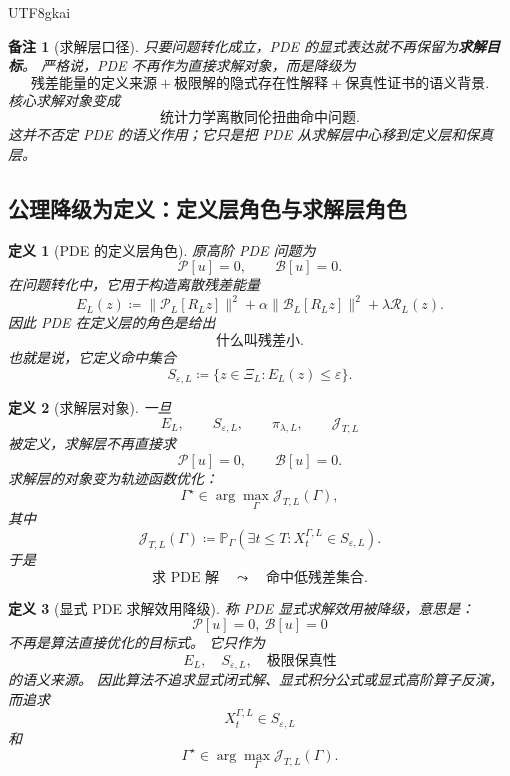 \documentclass[12pt]{article}
\newtheorem{definition}{定义}[section]
\newtheorem{remark}{备注}[section]
\newcommand{\DefEq}{\coloneqq}
\begin{document}
\begin{CJK*}{UTF8}{gkai}
\begin{remark}[求解层口径]
只要问题转化成立，PDE 的显式表达就不再保留为\textbf{求解目标}。
严格说，PDE 不再作为直接求解对象，而是降级为
\[
  \boxed{
  \text{残差能量的定义来源}
  +
  \text{极限解的隐式存在性解释}
  +
  \text{保真性证书的语义背景}.
  }
\]
核心求解对象变成
\[
  \boxed{
  \text{统计力学离散同伦扭曲命中问题}.
  }
\]
这并不否定 PDE 的语义作用；它只是把 PDE 从求解层中心移到定义层和保真层。
\end{remark}

\subsection{公理降级为定义：定义层角色与求解层角色}
\label{subsec:tex55-explicit-demotion-definitions}

\begin{definition}[PDE 的定义层角色]
\label{def:tex55-pde-definition-layer-role}
原高阶 PDE 问题为
\[
  \mathcal P[u]=0,
  \qquad
  \mathcal B[u]=0.
\]
在问题转化中，它用于构造离散残差能量
\[
  E_L(z)
  \DefEq
  \lVert\mathcal P_L[R_Lz]\rVert^2
  +\alpha\lVert\mathcal B_L[R_Lz]\rVert^2
  +\lambda\mathcal R_L(z).
\]
因此 PDE 在定义层的角色是给出
\[
  \text{什么叫残差小}.
\]
也就是说，它定义命中集合
\[
  S_{\varepsilon,L}
  \DefEq
  \{z\in\Xi_L:E_L(z)\le\varepsilon\}.
\]
\end{definition}

\begin{definition}[求解层对象]
\label{def:tex55-pde-solving-layer-object}
一旦
\[
  E_L,
  \qquad
  S_{\varepsilon,L},
  \qquad
  \pi_{\lambda,L},
  \qquad
  \mathcal J_{T,L}
\]
被定义，求解层不再直接求
\[
  \mathcal P[u]=0,
  \qquad
  \mathcal B[u]=0.
\]
求解层的对象变为轨迹函数优化：
\[
  \Gamma^\star
  \in
  \arg\max_\Gamma
  \mathcal J_{T,L}(\Gamma),
\]
其中
\[
  \mathcal J_{T,L}(\Gamma)
  \DefEq
  \mathbb P_\Gamma
  \left(
  \exists t\le T:
  X_t^{\Gamma,L}\in S_{\varepsilon,L}
  \right).
\]
于是
\[
  \boxed{
  \text{求 PDE 解}
  \quad
  \leadsto
  \quad
  \text{命中低残差集合}.
  }
\]
\end{definition}

\begin{definition}[显式 PDE 求解效用降级]
\label{def:tex55-explicit-pde-demotion}
称 PDE 显式求解效用被降级，意思是：
\[
  \mathcal P[u]=0,\ \mathcal B[u]=0
\]
不再是算法直接优化的目标式。
它只作为
\[
  E_L,\quad S_{\varepsilon,L},\quad \text{极限保真性}
\]
的语义来源。
因此算法不追求显式闭式解、显式积分公式或显式高阶算子反演，而追求
\[
  X_t^{\Gamma,L}\in S_{\varepsilon,L}
\]
和
\[
  \Gamma^\star\in\arg\max_\Gamma\mathcal J_{T,L}(\Gamma).
\]
\end{definition}


\end{CJK*}
\end{document}
